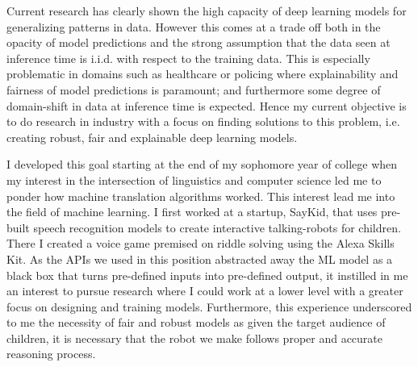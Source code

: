 \documentclass[12pt]{article}
\begin{document}





Current research has clearly shown the high capacity of deep learning models for generalizing patterns in data. However this comes at a trade off both in the opacity of model predictions and the strong assumption that the data seen at inference time is i.i.d. with respect to the training data. This is especially problematic in domains such as healthcare or policing where explainability and fairness of model predictions is paramount; and furthermore some degree of domain-shift in data at inference time is expected. Hence my current objective is to do research in industry with a focus on finding solutions to this problem, i.e. creating robust, fair and explainable deep learning models.


I developed this goal starting at the end of my sophomore year of college when my interest in the intersection of linguistics and computer science led me to ponder how machine translation algorithms worked. This interest lead me into the field of machine learning.
I first worked at a startup, SayKid, that uses pre-built speech recognition models to create interactive talking-robots for children. There I created a voice game premised on riddle solving using the Alexa Skills Kit. As the APIs we used in this position abstracted away the ML model as a black box that turns pre-defined inputs into pre-defined output, it instilled in me an interest to pursue research where I could work at a lower level with a greater focus on designing and training models. Furthermore, this experience underscored to me the necessity of fair and robust models as given the target audience of children, it is necessary that the robot we make follows proper and accurate reasoning process.
\end{document}
